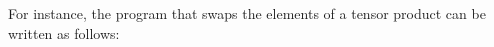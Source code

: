 \begin{example} \label{example:prog_swap}

For instance, the program that swaps the elements of a tensor product can be written as follows:
\begin{comment}
\begin{equation*}
\begin{split}
 \textbf{SwapTensor} \triangleq & - \triangleright \lambda x: \mathbb{A \otimes B}. \text{pm} \hspace{3 pt} x\hspace{3 pt} \text{to} \hspace{3 pt} a \otimes b. \hspace{1pt} b \otimes a : \mathbb{B} \otimes \mathbb{A}
\end{split}
\end{equation*}
Now, to prove that this program is well-typed one can write the following typing derivation:
\begin{equation*}
\begin{split}
1 \hspace{10 pt} & x : \mathbb{A} \triangleright x : \mathbb{A} \otimes \mathbb{B}   \hspace{10 pt} & {(\text{hyp})} \\
2 \hspace{10 pt} &  b : \mathbb{B} \triangleright   b : \mathbb{B} \hspace{10 pt}&{(\text{hyp})} \\
3 \hspace{10 pt} &   a : \mathbb{A} \triangleright  a : \mathbb{A} \hspace{10 pt}&{(\text{hyp})} \\
4 \hspace{10 pt} &   b : \mathbb{B},a : \mathbb{A} \triangleright b \otimes a : \mathbb{B} \otimes \mathbb{A} \hspace{10pt} &\text{($2,3,\otimes_i$)} \\
5\hspace{10 pt}& x : \mathbb{A} \otimes \typeB \triangleright \text{pm} \hspace{3 pt} x \hspace{3 pt} \text{to} \hspace{3 pt} a \otimes b. \hspace{1pt} b \otimes a : \mathbb{B} \otimes \mathbb{A}& \hspace{10pt} \text{($4,\otimes_e$)} \\
6 \hspace{10 pt}& - \triangleright \lambda x: \mathbb{A \otimes B}. \text{pm} \hspace{3 pt} x\hspace{3 pt} \text{to} \hspace{3 pt} a \otimes b. \hspace{1pt} b \otimes a : \mathbb{B} \otimes \mathbb{A} & \text{($5,\multimap_i$)}

\end{comment}
\end{example}
